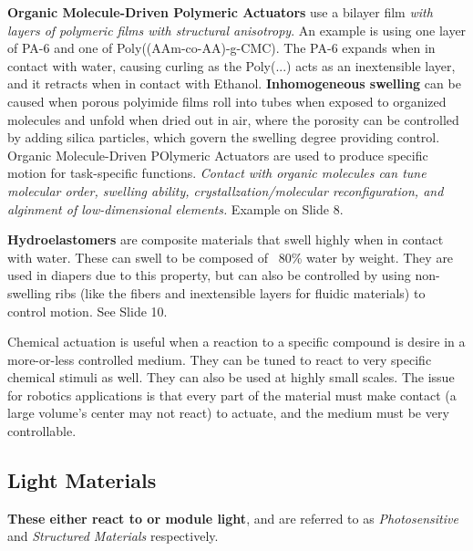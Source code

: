 \documentclass[onecolumn,a4paper]{article}
\begin{document}
\textbf{Organic Molecule-Driven Polymeric Actuators} use a bilayer film \emph{with layers of polymeric films with structural anisotropy}. An example is using one layer of PA-6 and one of Poly((AAm-co-AA)-g-CMC). The PA-6 expands when in contact with water, causing curling as the Poly(...) acts as an inextensible layer, and it retracts when in contact with Ethanol. \textbf{Inhomogeneous swelling} can be caused when porous polyimide films roll into tubes when exposed to organized molecules and unfold when dried out in air, where the porosity can be controlled by adding silica particles, which govern the swelling degree providing control. Organic Molecule-Driven POlymeric Actuators are used to produce specific motion for task-specific functions. \emph{Contact with organic molecules can tune molecular order, swelling ability, crystallzation/molecular reconfiguration, and alginment of low-dimensional elements.} Example on Slide 8.

\textbf{Hydroelastomers} are composite materials that swell highly when in contact with water. These can swell to be composed of ~80\% water by weight. They are used in diapers due to this property, but can also be controlled by using non-swelling ribs (like the fibers and inextensible layers for fluidic materials) to control motion. See Slide 10.

Chemical actuation is useful when a reaction to a specific compound is desire in a more-or-less controlled medium. They can be tuned to react to very specific chemical stimuli as well.  They can also be used at highly small scales. The issue for robotics applications is that every part of the material must make contact (a large volume's center may not react) to actuate, and the medium must be very controllable.

\subsection{Light Materials}

\textbf{These either react to or module light}, and are referred to as \emph{Photosensitive} and \emph{ Structured Materials} respectively.
\end{document}
